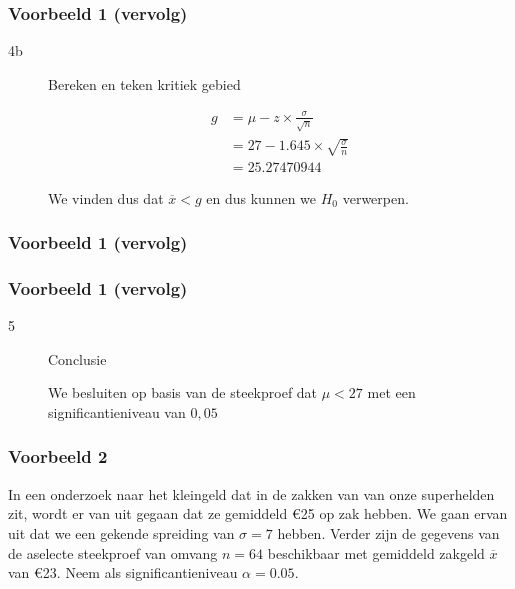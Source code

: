 \documentclass[aspectratio=169]{beamer}
\begin{document}
\begin{frame}
  \frametitle{Voorbeeld 1 (vervolg)}
  
  \begin{description}
    
    \item[4b] Bereken en teken kritiek gebied
    
    \begin{align*}
    g &= \mu - z \times \frac{\sigma}{\sqrt{n}} \\
    &= 27 - 1.645 \times \sqrt{\frac{\sigma}{n}} \\
    &= 25.27470944
    \end{align*}
    
    We vinden dus dat $\overline{x} < g$ en dus kunnen we $H_{0}$ verwerpen.
  \end{description}
\end{frame}

\begin{frame}
  \frametitle{Voorbeeld 1 (vervolg)}
  
  \bigskip
  \centering
\end{frame}

\begin{frame}
  \frametitle{Voorbeeld 1 (vervolg)}
  
  \begin{description}
    
    \item[5] Conclusie
    
    We besluiten op basis van de steekproef dat $\mu < 27$ met een significantieniveau van $0,05$
  \end{description}
\end{frame}


\begin{frame}
  \frametitle{Voorbeeld 2}
  In een onderzoek naar het kleingeld dat in de zakken van  van  onze superhelden zit, wordt er van uit gegaan dat ze gemiddeld \euro{25} op zak hebben. We gaan ervan uit dat we een gekende spreiding van $\sigma = 7$ hebben. Verder zijn de gegevens van de aselecte steekproef van omvang $n=64$ beschikbaar met gemiddeld zakgeld $\overline{x}$ van \euro{23}. Neem als significantieniveau $\alpha = 0.05$.
\end{frame}
\end{document}
